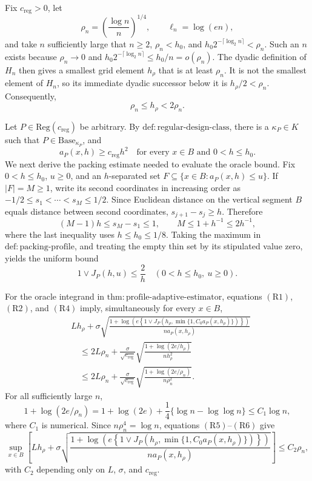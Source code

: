 Fix \(c_{\mathrm{reg}}>0\), let
\[
 \rho_n=\left(\frac{\log n}{n}\right)^{1/4},
 \qquad \ell_n=\log(en),
\]
and take \(n\) sufficiently large that \(n\geq2\), \(\rho_n<h_0\), and
\(h_0 2^{-\lceil\log_2 n\rceil}<\rho_n\).  Such an \(n\) exists because
\(\rho_n\to0\) and
\(h_0 2^{-\lceil\log_2 n\rceil}\leq h_0/n=o(\rho_n)\).  The dyadic
definition of \(H_n\) then gives a smallest grid element \(h_{\rho}\) that
is at least \(\rho_n\).  It is not the smallest element of \(H_n\), so its
immediate dyadic successor below it is \(h_{\rho}/2<\rho_n\).  Consequently,
\[
 \rho_n\leq h_{\rho}<2\rho_n. \tag{R1}
\]

Let \(P\in\mathrm{Reg}(c_{\mathrm{reg}})\) be arbitrary.  By
\(\mathrm{def{:}regular\text{-}design\text{-}class}\), there is a
\(\kappa_P\in K\) such that \(P\in\mathrm{Base}_{\kappa_P}\), and
\[
 a_P(x,h)\geq c_{\mathrm{reg}}h^2
 \quad\text{for every }x\in B\text{ and }0<h\leq h_0. \tag{R2}
\]
We next derive the packing estimate needed to evaluate the oracle bound.
Fix \(0<h\leq h_0\), \(u\geq0\), and an \(h\)-separated set
\(F\subseteq\{x\in B:a_P(x,h)\leq u\}\).  If \(|F|=M\geq1\), write its
second coordinates in increasing order as
\(-1/2\leq s_1<\cdots<s_M\leq1/2\).  Since Euclidean distance on the
vertical segment \(B\) equals distance between second coordinates,
\(s_{j+1}-s_j\geq h\).  Therefore
\[
 (M-1)h\leq s_M-s_1\leq1,
 \qquad
 M\leq 1+h^{-1}\leq 2h^{-1}, \tag{R3}
\]
where the last inequality uses \(h\leq h_0\leq1/8\).  Taking the maximum
in \(\mathrm{def{:}packing\text{-}profile}\), and treating the empty thin
set by its stipulated value zero, yields the uniform bound
\[
 1\vee J_P(h,u)\leq\frac{2}{h}
 \quad(0<h\leq h_0,\ u\geq0). \tag{R4}
\]

For the oracle integrand in
\(\mathrm{thm{:}profile\text{-}adaptive\text{-}estimator}\), equations
\((\mathrm{R1})\), \((\mathrm{R2})\), and \((\mathrm{R4})\) imply,
simultaneously for every \(x\in B\),
\[
\begin{aligned}
&Lh_{\rho}+\sigma\sqrt{
 \frac{1+\log\!\left(
 e\left\{1\vee J_P\!\left(h_{\rho},
 \min\{1,C_0a_P(x,h_{\rho})\}\right)\right\}\right)}
 {n a_P(x,h_{\rho})}} \\
&\quad\leq 2L\rho_n+
 \frac{\sigma}{\sqrt{c_{\mathrm{reg}}}}
 \sqrt{\frac{1+\log(2e/h_{\rho})}{n h_{\rho}^2}} \\
&\quad\leq 2L\rho_n+
 \frac{\sigma}{\sqrt{c_{\mathrm{reg}}}}
 \sqrt{\frac{1+\log(2e/\rho_n)}{n\rho_n^2}}. \tag{R5}
\end{aligned}
\]
For all sufficiently large \(n\),
\[
 1+\log(2e/\rho_n)
 =1+\log(2e)+\frac14\{\log n-\log\log n\}
 \leq C_1\log n, \tag{R6}
\]
where \(C_1\) is numerical.  Since \(n\rho_n^4=\log n\), equations
\((\mathrm{R5})\)--\((\mathrm{R6})\) give
\[
 \sup_{x\in B}\left[
 Lh_{\rho}+\sigma\sqrt{
 \frac{1+\log\!\left(
 e\left\{1\vee J_P\!\left(h_{\rho},
 \min\{1,C_0a_P(x,h_{\rho})\}\right)\right\}\right)}
 {n a_P(x,h_{\rho})}}
 \right]
 \leq C_2\rho_n, \tag{R7}
\]
with \(C_2\) depending only on \(L\), \(\sigma\), and
\(c_{\mathrm{reg}}\).

